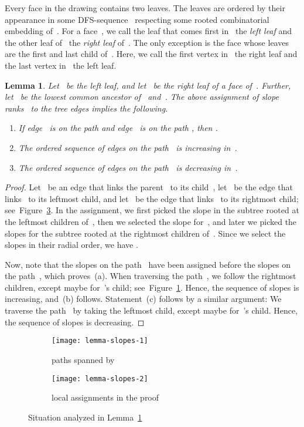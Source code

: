 \documentclass[a4paper,11pt]{article}
\theoremstyle{plain}
\newtheorem{lemma}{Lemma}
\begin{document}
Every face in the drawing contains two leaves. The leaves are ordered by 
their appearance in some DFS-sequence~ respecting some rooted 
combinatorial embedding of~. For a face~, we call the leaf that comes 
first in~ the \emph{left leaf} and the other leaf of~  the 
\emph{right leaf} of~. The only exception is the face whose leaves are the 
first and last child of~. Here, we call the first vertex 
in~ the right leaf and the last vertex in~ the left 
leaf.

\begin{lemma}\label{lem:inc_slopes}
  Let~ be the left leaf, and let~ be the right leaf of a face of~. 
  Further, let~ be the lowest common ancestor of~ and~. The above assignment 
  of slope ranks~ to the tree edges implies the following.
  \begin{enumerate}[label=(a)]
		\item If edge~ is on the path 
			and edge~ is on the path ,
			then .
		\item The ordered sequence of edges on the path~ is increasing in~.
		\item The ordered sequence of edges on the path~ is decreasing in~.
  \end{enumerate}
\end{lemma}

\begin{proof}
  Let~ be an edge that links the parent~ to its child~, 
  let~ be the edge that links~ to its leftmost child, and let~ be
  the edge that links~ to its rightmost child;
  see~Figure~\ref{fig:slopelem2}. In the assignment, we first picked
  the slope in the subtree rooted at the leftmost children of~,
  then we selected the slope for~, and later we picked the slopes
  for the subtree rooted at the rightmost children of~. Since we
  select the slopes in their radial order, we have .

  Now, note that the slopes on the path~ have been assigned
  before the slopes on the path~, which proves~(a).  When
  traversing the path~, we follow the rightmost children,
  except maybe for~'s child; see~Figure~\ref{fig:slopelem1}. Hence,
  the sequence of slopes is increasing, and~(b) follows. Statement~(c)
  follows by a similar argument: We traverse the path~ by
  taking the leftmost child, except maybe for~'s child.  Hence, the
  sequence of slopes is decreasing.
\end{proof}

  \begin{figure}[tb]
    \hfill
    \begin{subfigure}[b]{.45\columnwidth}
      \centering
      \texttt{[image: lemma-slopes-1]}
      \caption{paths spanned by~ }
      \label{fig:slopelem1}
    \end{subfigure}
    \hfill
    \begin{subfigure}[b]{.45\columnwidth}
      \centering
      \texttt{[image: lemma-slopes-2]}
      \caption{local assignments in the proof}
      \label{fig:slopelem2}
    \end{subfigure}
    \hfill
    \caption{Situation analyzed in Lemma~\ref{lem:inc_slopes}}
  \end{figure}
\end{document}
